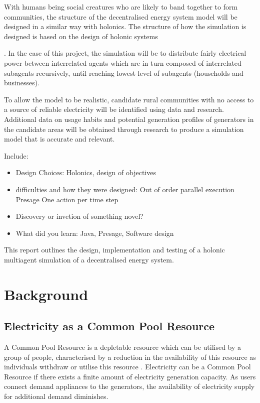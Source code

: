 \documentclass{article}
\begin{document}
With humans being social creatures who are likely to band together to form communities, the structure of the decentralised energy system model will be designed in a similar way with holonics. The structure of how the simulation is designed is based on the design of holonic systems . In the case of this project, the simulation will be to distribute fairly electrical power between interrelated agents which are in turn composed of interrelated subagents recursively, until reaching lowest level of subagents (households and businesses). 

To allow the model to be realistic, candidate rural communities with no access to a source of reliable electricity will be identified using data and research. Additional data on usage habits and potential generation profiles of generators in the candidate areas will be obtained through research to produce a simulation model that is accurate and relevant.

Include:
\begin{itemize}
\item Design Choices: Holonics, design of objectives
\item difficulties and how they were designed:
\subitem Out of order parallel execution
\subitem Presage
\subitem One action per time step
\item Discovery or invetion of something novel?
\item What did you learn:
\subitem Java, Presage, Software design
\end{itemize}


This report outlines the design, implementation and testing of a holonic multiagent simulation of a decentralised energy system. 

\section{Background}

\subsection{Electricity as a Common Pool Resource}
A Common Pool Resource is a depletable resource which can be utilised by a group of people, characterised by a reduction in the availability of this resource as individuals withdraw or utilise this resource \cite{Ostrom:90}.  Electricity can be a Common Pool Resource if there exists a finite amount of electricity generation capacity. As users connect demand appliances to the generators, the availability of electricity supply for additional demand diminishes.
\end{document}
